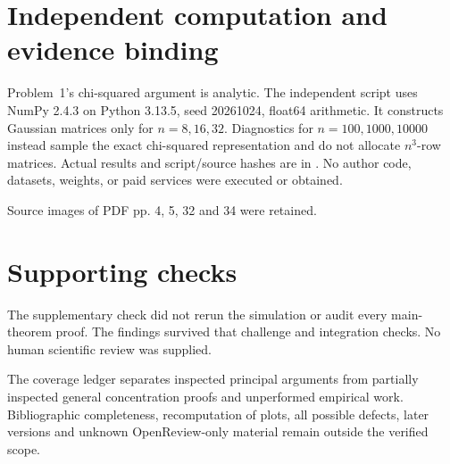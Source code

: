 \documentclass[10pt]{article}
\begin{document}
\section*{Independent computation and evidence binding}
Problem 1’s chi-squared argument is analytic. The independent script uses NumPy 2.4.3 on Python 3.13.5, seed 20261024, float64 arithmetic. It constructs Gaussian matrices only for \(n=8,16,32\). Diagnostics for \(n=100,1000,10000\) instead sample the exact chi-squared representation and do not allocate \(n^3\)-row matrices. Actual results and script/source hashes are in . No author code, datasets, weights, or paid services were executed or obtained.\par
Source images of PDF pp. 4, 5, 32 and 34 were retained.\par
\section*{Supporting checks}
The supplementary check did not rerun the simulation or audit every main-theorem proof. The findings survived that challenge and integration checks. No human scientific review was supplied.\par
The coverage ledger separates inspected principal arguments from partially inspected general concentration proofs and unperformed empirical work. Bibliographic completeness, recomputation of plots, all possible defects, later versions and unknown OpenReview-only material remain outside the verified scope.\par
\end{document}

